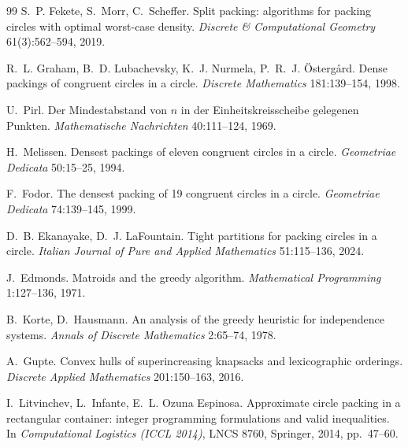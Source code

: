 \documentclass[11pt]{article}
\theoremstyle{definition}
\begin{document}
\begin{thebibliography}{99}
S.~P. Fekete, S.~Morr, C.~Scheffer.
Split packing: algorithms for packing circles with optimal worst-case density.
\emph{Discrete \& Computational Geometry} 61(3):562--594, 2019.

R.~L. Graham, B.~D. Lubachevsky, K.~J. Nurmela, P.~R.~J. \"Osterg\aa rd.
Dense packings of congruent circles in a circle.
\emph{Discrete Mathematics} 181:139--154, 1998.

U.~Pirl.
Der Mindestabstand von $n$ in der Einheitskreisscheibe gelegenen Punkten.
\emph{Mathematische Nachrichten} 40:111--124, 1969.

H.~Melissen.
Densest packings of eleven congruent circles in a circle.
\emph{Geometriae Dedicata} 50:15--25, 1994.

F.~Fodor.
The densest packing of 19 congruent circles in a circle.
\emph{Geometriae Dedicata} 74:139--145, 1999.

D.~B. Ekanayake, D.~J. LaFountain.
Tight partitions for packing circles in a circle.
\emph{Italian Journal of Pure and Applied Mathematics} 51:115--136, 2024.

J.~Edmonds.
Matroids and the greedy algorithm.
\emph{Mathematical Programming} 1:127--136, 1971.

B.~Korte, D.~Hausmann.
An analysis of the greedy heuristic for independence systems.
\emph{Annals of Discrete Mathematics} 2:65--74, 1978.

A.~Gupte.
Convex hulls of superincreasing knapsacks and lexicographic orderings.
\emph{Discrete Applied Mathematics} 201:150--163, 2016.

I.~Litvinchev, L.~Infante, E.~L. Ozuna Espinosa.
Approximate circle packing in a rectangular container: integer programming
formulations and valid inequalities.
In \emph{Computational Logistics (ICCL 2014)}, LNCS 8760, Springer, 2014,
pp.\ 47--60.

\end{thebibliography}
\end{document}
